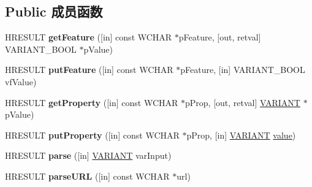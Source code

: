 \subsection*{Public 成员函数}
\begin{DoxyCompactItemize}
\item 
\mbox{\label{interface_m_s_x_m_l2_1_1_i_v_b_s_a_x_x_m_l_reader_a8b2943871e009896857070cfb8a748a1}} 
H\+R\+E\+S\+U\+LT {\bfseries get\+Feature} (\mbox{[}in\mbox{]} const W\+C\+H\+AR $\ast$p\+Feature, \mbox{[}out, retval\mbox{]} V\+A\+R\+I\+A\+N\+T\+\_\+\+B\+O\+OL $\ast$p\+Value)
\item 
\mbox{\label{interface_m_s_x_m_l2_1_1_i_v_b_s_a_x_x_m_l_reader_ac77305230d06e080d65b7d129b129889}} 
H\+R\+E\+S\+U\+LT {\bfseries put\+Feature} (\mbox{[}in\mbox{]} const W\+C\+H\+AR $\ast$p\+Feature, \mbox{[}in\mbox{]} V\+A\+R\+I\+A\+N\+T\+\_\+\+B\+O\+OL vf\+Value)
\item 
\mbox{\label{interface_m_s_x_m_l2_1_1_i_v_b_s_a_x_x_m_l_reader_aa7b6509864d47009616e76621ebce414}} 
H\+R\+E\+S\+U\+LT {\bfseries get\+Property} (\mbox{[}in\mbox{]} const W\+C\+H\+AR $\ast$p\+Prop, \mbox{[}out, retval\mbox{]} \hyperlink{structtag_v_a_r_i_a_n_t}{V\+A\+R\+I\+A\+NT} $\ast$p\+Value)
\item 
\mbox{\label{interface_m_s_x_m_l2_1_1_i_v_b_s_a_x_x_m_l_reader_ab41897ff39ea0d6ba4884dc35a4f1a15}} 
H\+R\+E\+S\+U\+LT {\bfseries put\+Property} (\mbox{[}in\mbox{]} const W\+C\+H\+AR $\ast$p\+Prop, \mbox{[}in\mbox{]} \hyperlink{structtag_v_a_r_i_a_n_t}{V\+A\+R\+I\+A\+NT} \hyperlink{unionvalue}{value})
\item 
\mbox{\label{interface_m_s_x_m_l2_1_1_i_v_b_s_a_x_x_m_l_reader_a34ea86ba6ed75fb16b5783054c5309fe}} 
H\+R\+E\+S\+U\+LT {\bfseries parse} (\mbox{[}in\mbox{]} \hyperlink{structtag_v_a_r_i_a_n_t}{V\+A\+R\+I\+A\+NT} var\+Input)
\item 
\mbox{\label{interface_m_s_x_m_l2_1_1_i_v_b_s_a_x_x_m_l_reader_afefe990b5d59492448d014b5d2a237bf}} 
H\+R\+E\+S\+U\+LT {\bfseries parse\+U\+RL} (\mbox{[}in\mbox{]} const W\+C\+H\+AR $\ast$url)

\end{DoxyCompactItemize}
